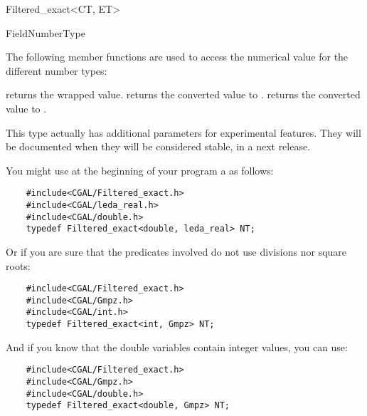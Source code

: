 \begin{ccRefClass}{Filtered_exact<CT, ET>}

\ccIsModel
FieldNumberType

\ccOperations

The following member functions are used to access the numerical value for the
different number types:

 {returns the wrapped value.}
 {returns the converted value to .}
 {returns the converted value
                                             to .}


This type actually has additional parameters for experimental features.  They
will be documented when they will be considered stable, in a next release.

\ccExample

You might use at the beginning of your program a  as follows:

\begin{verbatim}
    #include<CGAL/Filtered_exact.h>
    #include<CGAL/leda_real.h>
    #include<CGAL/double.h>
    typedef Filtered_exact<double, leda_real> NT;
\end{verbatim}

Or if you are sure that the predicates involved do not use divisions nor
square roots:

\begin{verbatim}
    #include<CGAL/Filtered_exact.h>
    #include<CGAL/Gmpz.h>
    #include<CGAL/int.h>
    typedef Filtered_exact<int, Gmpz> NT;
\end{verbatim}

And if you know that the double variables contain integer values, you can
use:

\begin{verbatim}
    #include<CGAL/Filtered_exact.h>
    #include<CGAL/Gmpz.h>
    #include<CGAL/double.h>
    typedef Filtered_exact<double, Gmpz> NT;
\end{verbatim}


\end{ccRefClass}
